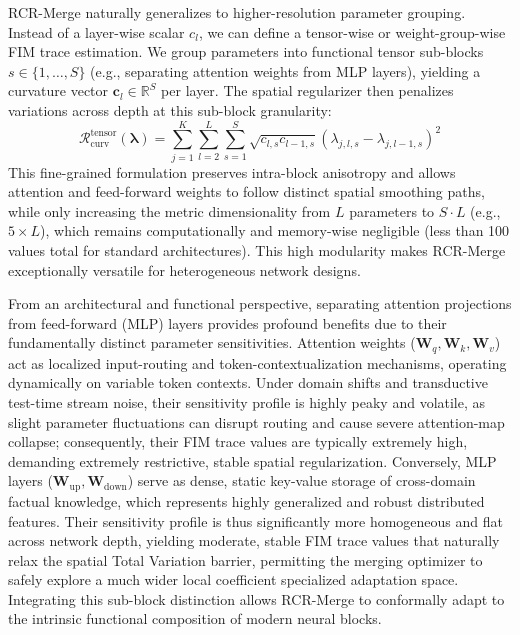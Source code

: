 RCR-Merge naturally generalizes to higher-resolution parameter grouping. Instead of a layer-wise scalar $c_l$, we can define a tensor-wise or weight-group-wise FIM trace estimation. We group parameters into functional tensor sub-blocks $s \in \{1, \dots, S\}$ (e.g., separating attention weights from MLP layers), yielding a curvature vector $\mathbf{c}_l \in \mathbb{R}^S$ per layer. The spatial regularizer then penalizes variations across depth at this sub-block granularity:
\begin{equation}
\mathcal{R}_{\text{curv}}^{\text{tensor}}(\boldsymbol{\lambda}) = \sum_{j=1}^K \sum_{l=2}^L \sum_{s=1}^S \sqrt{c_{l, s} c_{l-1, s}} (\lambda_{j, l, s} - \lambda_{j, l-1, s})^2
\end{equation}
This fine-grained formulation preserves intra-block anisotropy and allows attention and feed-forward weights to follow distinct spatial smoothing paths, while only increasing the metric dimensionality from $L$ parameters to $S \cdot L$ (e.g., $5 \times L$), which remains computationally and memory-wise negligible (less than 100 values total for standard architectures). This high modularity makes RCR-Merge exceptionally versatile for heterogeneous network designs.

From an architectural and functional perspective, separating attention projections from feed-forward (MLP) layers provides profound benefits due to their fundamentally distinct parameter sensitivities. Attention weights ($\mathbf{W}_q, \mathbf{W}_k, \mathbf{W}_v$) act as localized input-routing and token-contextualization mechanisms, operating dynamically on variable token contexts. Under domain shifts and transductive test-time stream noise, their sensitivity profile is highly peaky and volatile, as slight parameter fluctuations can disrupt routing and cause severe attention-map collapse; consequently, their FIM trace values are typically extremely high, demanding extremely restrictive, stable spatial regularization. Conversely, MLP layers ($\mathbf{W}_{\text{up}}, \mathbf{W}_{\text{down}}$) serve as dense, static key-value storage of cross-domain factual knowledge, which represents highly generalized and robust distributed features. Their sensitivity profile is thus significantly more homogeneous and flat across network depth, yielding moderate, stable FIM trace values that naturally relax the spatial Total Variation barrier, permitting the merging optimizer to safely explore a much wider local coefficient specialized adaptation space. Integrating this sub-block distinction allows RCR-Merge to conformally adapt to the intrinsic functional composition of modern neural blocks.

